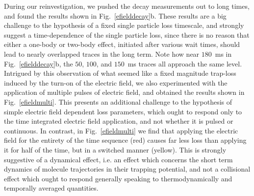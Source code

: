 During our reinvestigation, we pushed the decay measurements out to long times, and found the results shown in Fig.~\ref{efielddecay}b.
These results are a big challenge to the hypothesis of a fixed single particle loss timescale, and strongly suggest a time-dependence of the single particle loss, since there is no reason that either a one-body or two-body effect, initiated after various wait times, should lead to nearly overlapped traces in the long term.
Note how near $180$~ms in Fig.~\ref{efielddecay}b, the $50$, $100$, and $150$~ms traces all approach the same level.
Intrigued by this observation of what seemed like a fixed magnitude trap-loss induced by the turn-on of the electric field, we also experimented with the application of multiple pulses of electric field, and obtained the results shown in Fig.~\ref{efieldmulti}.
This presents an additional challenge to the hypothesis of simple electric field dependent loss parameters, which ought to respond only to the time integrated electric field application, and not whether it is pulsed or continuous.
In contrast, in Fig.~\ref{efieldmulti} we find that applying the electric field for the entirety of the time sequence (red) causes far less loss than applying it for half of the time, but in a switched manner (yellow).
This is strongly suggestive of a dynamical effect, i.e. an effect which concerns the short term dynamics of molecule trajectories in their trapping potential, and not a collisional effect which ought to respond generally speaking to thermodynamically and temporally averaged quantities.


